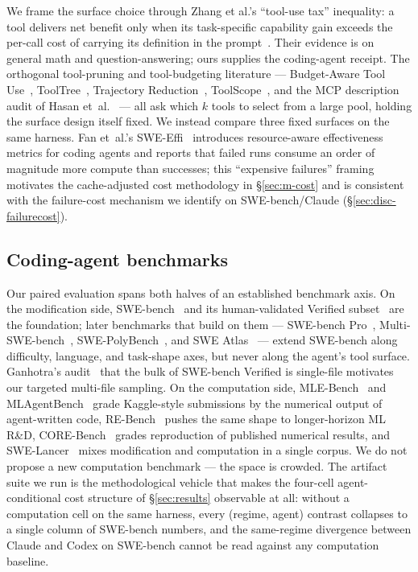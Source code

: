 We frame the surface choice through Zhang et al.'s ``tool-use tax''
inequality: a tool delivers net benefit only when its task-specific
capability gain exceeds the per-call cost of carrying its definition
in the prompt~\cite{zhang2026tooltax}. Their evidence is on general
math and question-answering; ours supplies the coding-agent receipt.
The orthogonal tool-pruning and tool-budgeting literature ---
Budget-Aware Tool Use~\cite{budgetawaretooluse2025},
ToolTree~\cite{tooltree2026}, Trajectory
Reduction~\cite{trajectoryreduction2025}, ToolScope~\cite{toolscope},
and the MCP description audit of Hasan
et~al.~\cite{mcptooldescsmelly2026} --- all ask which $k$ tools to
select from a large pool, holding the surface design itself fixed.
We instead compare three fixed surfaces on the same harness. Fan
et~al.'s SWE-Effi~\cite{fan2025sweeffi} introduces resource-aware
effectiveness metrics for coding agents and reports that failed runs
consume an order of magnitude more compute than successes; this
``expensive failures'' framing motivates the cache-adjusted cost
methodology in §\ref{sec:m-cost} and is consistent with the
failure-cost mechanism we identify on SWE-bench/Claude
(§\ref{sec:disc-failurecost}).

\subsection{Coding-agent benchmarks}
\label{sec:relwork-artifacts}

Our paired evaluation spans both halves of an established benchmark
axis. On the modification side, SWE-bench~\cite{jimenez2024swebench}
and its human-validated Verified
subset~\cite{report:openai2024swebenchverified} are the foundation;
later benchmarks that build on them --- SWE-bench Pro~\cite{scaleai2025swebenchpro},
Multi-SWE-bench~\cite{bytedance2025multiswebench},
SWE-PolyBench~\cite{amazon2025swepolybench}, and SWE
Atlas~\cite{sweatlas2026} --- extend SWE-bench along difficulty,
language, and task-shape axes, but never along the agent's tool surface.
Ganhotra's audit~\cite{blog:ganhotra2025multifile} that the bulk of
SWE-bench Verified is single-file motivates our targeted multi-file
sampling. On the computation side, MLE-Bench~\cite{chan2024mlebench}
and MLAgentBench~\cite{huang2024mlagentbench} grade Kaggle-style
submissions by the numerical output of agent-written code,
RE-Bench~\cite{wijk2024rebench} pushes the same shape to longer-horizon
ML R\&D, CORE-Bench~\cite{siegel2024corebench} grades reproduction of
published numerical results, and SWE-Lancer~\cite{miserendino2025swelancer}
mixes modification and computation in a single corpus. We do not
propose a new computation benchmark --- the space is crowded. The
artifact suite we run is the methodological vehicle that makes the
four-cell agent-conditional cost structure of §\ref{sec:results}
observable at all: without a computation cell on the same harness,
every (regime, agent) contrast collapses to a single column of
SWE-bench numbers, and the same-regime divergence between Claude and
Codex on SWE-bench cannot be read against any computation baseline.

